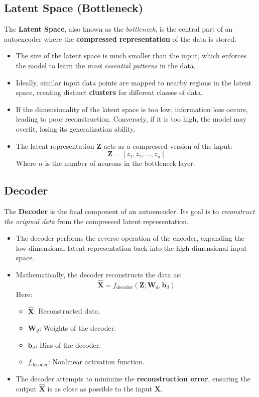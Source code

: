 \documentclass[a4paper,12pt]{article}
\begin{document}
\subsection{Latent Space (Bottleneck)}  
The \textbf{Latent Space}, also known as the \textit{bottleneck}, is the central part of an autoencoder where the \textbf{compressed representation} of the data is stored.  
\begin{itemize}
    \item The size of the latent space is much smaller than the input, which enforces the model to learn the \textit{most essential patterns} in the data.  
    \item Ideally, similar input data points are mapped to nearby regions in the latent space, creating distinct \textbf{clusters} for different classes of data.  
    \item If the dimensionality of the latent space is too low, information loss occurs, leading to poor reconstruction. Conversely, if it is too high, the model may overfit, losing its generalization ability.  
    \item The latent representation \( \mathbf{Z} \) acts as a compressed version of the input:  
    \[
    \mathbf{Z} = [z_1, z_2, \dots, z_n]
    \]
    Where \( n \) is the number of neurons in the bottleneck layer.
\end{itemize}

\subsection{Decoder}  
The \textbf{Decoder} is the final component of an autoencoder. Its goal is to \textit{reconstruct the original data} from the compressed latent representation.  
\begin{itemize}
    \item The decoder performs the reverse operation of the encoder, expanding the low-dimensional latent representation back into the high-dimensional input space.  
    \item Mathematically, the decoder reconstructs the data as:
    \[
    \hat{\mathbf{X}} = f_{\text{decoder}}(\mathbf{Z}; \mathbf{W}_d, \mathbf{b}_d)
    \]
    Here:
    \begin{itemize}
        \item \( \hat{\mathbf{X}} \): Reconstructed data.  
        \item \( \mathbf{W}_d \): Weights of the decoder.  
        \item \( \mathbf{b}_d \): Bias of the decoder.  
        \item \( f_{\text{decoder}} \): Nonlinear activation function.  
    \end{itemize}  
    \item The decoder attempts to minimize the \textbf{reconstruction error}, ensuring the output \( \hat{\mathbf{X}} \) is as close as possible to the input \( \mathbf{X} \).
\end{itemize}
\end{document}
